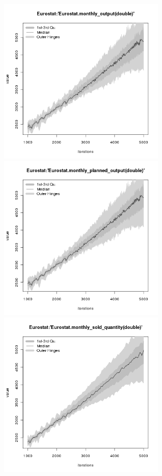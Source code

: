 \begin{figure}[H!]
\centering\leavevmode
\begin{minipage}{17cm}
\centering\leavevmode
\includegraphics[width=8cm]{./png/tax_0.10/Eurostat-monthly_output.png}
\includegraphics[width=8cm]{./png/tax_0.10/Eurostat-monthly_planned_output.png}\\
\includegraphics[width=8cm]{./png/tax_0.10/Eurostat-monthly_sold_quantity.png}

\end{minipage}
\end{figure}
